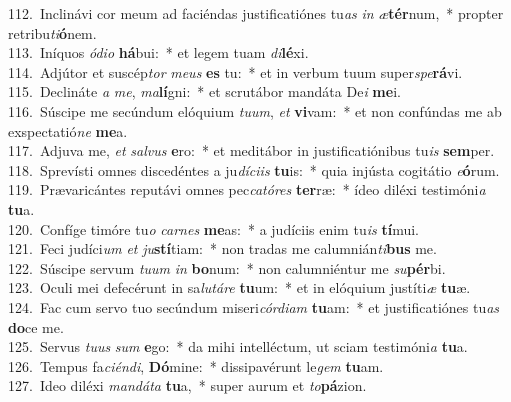 {112.~}Inclinávi cor meum ad faciéndas justificatiónes tu\textit{as} \textit{in} \textit{æ}\textbf{tér}num,~* propter retribu\textit{ti}\textbf{ó}nem.\\
{113.~}Iníquos \textit{ó}\textit{di}\textit{o} \textbf{há}bui:~* et legem tuam \textit{di}\textbf{lé}xi.\\
{114.~}Adjútor et suscép\textit{tor} \textit{me}\textit{us} \textbf{es} tu:~* et in verbum tuum super\textit{spe}\textbf{rá}vi.\\
{115.~}Declináte \textit{a} \textit{me}, \textit{ma}\textbf{lí}gni:~* et scrutábor mandáta De\textit{i} \textbf{me}i.\\
{116.~}Súscipe me secúndum elóquium \textit{tu}\textit{um}, \textit{et} \textbf{vi}vam:~* et non confúndas me ab exspectatió\textit{ne} \textbf{me}a.\\
{117.~}Adjuva me, \textit{et} \textit{sal}\textit{vus} \textbf{e}ro:~* et meditábor in justificatiónibus tu\textit{is} \textbf{sem}per.\\
{118.~}Sprevísti omnes discedéntes a ju\textit{dí}\textit{ci}\textit{is} \textbf{tu}is:~* quia injústa cogitátio \textit{e}\textbf{ó}rum.\\
{119.~}Prævaricántes reputávi omnes pec\textit{ca}\textit{tó}\textit{res} \textbf{ter}ræ:~* ídeo diléxi testimóni\textit{a} \textbf{tu}a.\\
{120.~}Confíge timóre tu\textit{o} \textit{car}\textit{nes} \textbf{me}as:~* a judíciis enim tu\textit{is} \textbf{tí}mui.\\
{121.~}Feci judíci\textit{um} \textit{et} \textit{ju}\textbf{stí}tiam:~* non tradas me calumnián\textit{ti}\textbf{bus} me.\\
{122.~}Súscipe servum \textit{tu}\textit{um} \textit{in} \textbf{bo}num:~* non calumniéntur me \textit{su}\textbf{pér}bi.\\
{123.~}Oculi mei defecérunt in sa\textit{lu}\textit{tá}\textit{re} \textbf{tu}um:~* et in elóquium justíti\textit{æ} \textbf{tu}æ.\\
{124.~}Fac cum servo tuo secúndum miseri\textit{cór}\textit{di}\textit{am} \textbf{tu}am:~* et justificatiónes tu\textit{as} \textbf{do}ce me.\\
{125.~}Servus \textit{tu}\textit{us} \textit{sum} \textbf{e}go:~* da mihi intelléctum, ut sciam testimóni\textit{a} \textbf{tu}a.\\
{126.~}Tempus fa\textit{ci}\textit{én}\textit{di}, \textbf{Dó}mine:~* dissipavérunt le\textit{gem} \textbf{tu}am.\\
{127.~}Ideo diléxi \textit{man}\textit{dá}\textit{ta} \textbf{tu}a,~* super aurum et \textit{to}\textbf{pá}zion.\\
